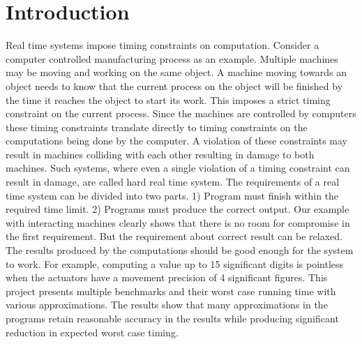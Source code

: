 \section{Introduction}
Real time systems impose timing constraints on computation. Consider a
computer controlled manufacturing process as an example. Multiple
machines may be moving and working on the same object. A machine
moving towards an object needs to know that the current process on the
object will be finished by the time it reaches the object to start its
work. This imposes a strict timing constraint on the current
process. Since the machines are controlled by computers these timing
constraints translate directly to timing constraints on the
computations being done by the computer. A violation of these
constraints may result in machines colliding with each other resulting
in damage to both machines. Such systems, where even a single
violation of a timing constraint can result in damage, are called hard
real time system. The requirements of a real time system can be
divided into two parts. 1) Program must finish within the required
time limit. 2) Programs must produce the correct output. Our example
with interacting machines clearly shows that there is no room for
compromise in the first requirement. But the requirement about correct
result can be relaxed. The results produced by the computations should
be good enough for the system to work. For example, computing a value
up to 15 significant digits is pointless when the actuators have a
movement precision of 4 significant figures. This project presents
multiple benchmarks and their worst case running time with various
approximations. The results show that many approximations in the
programs retain reasonable accuracy in the results while producing
significant reduction in expected worst case timing.
